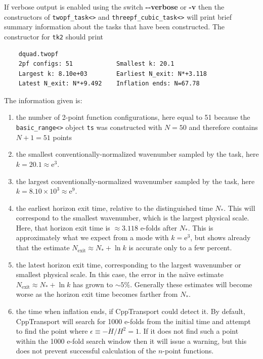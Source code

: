 \documentclass[11pt,a4paper]{article}
\newcommand{\e}[1]{\mathrm{e}^{{#1}}}
\newcommand{\Nexit}{N_{\text{exit}}}
\newcommand{\Nstar}{N_{\ast}}
\newcommand{\packagefont}{\sffamily}
\newcommand{\CppTransport}{{\packagefont CppTransport}}
\newcommand{\option}[1]{{\ttfamily\bfseries\small #1}}
\begin{document}
If verbose output is enabled using the switch
\option{{-}{-}verbose}
or
\option{-v}
then the constructors of
\texttt{twopf_task<>}
and \texttt{threepf_cubic_task<>}
will print brief summary information about the
tasks that have been constructed.
The constructor for \texttt{tk2}
should print
\begin{verbatim}
    dquad.twopf
    2pf configs: 51            Smallest k: 20.1           
    Largest k: 8.10e+03        Earliest N_exit: N*+3.118  
    Latest N_exit: N*+9.492    Inflation ends: N=67.78
\end{verbatim}
The information given is:
\begin{enumerate}
    \item the number of 2-point function configurations, here
    equal to 51 because the
    \texttt{basic_range<>} object \texttt{ts}
    was constructed with $N=50$ and therefore contains $N+1 = 51$
    points
    
    \item the smallest conventionally-normalized wavenumber sampled by
    the task, here
    $k = 20.1 \approx \e{3}$.
    
    \item the largest conventionally-normalized wavenumber sampled by
    the task, here
    $k = 8.10 \times 10^3 \approx \e{9}$.
    
    \item the earliest horizon exit time, relative to the distinguished
    time $\Nstar$. This will correspond to the smallest wavenumber,
    which is the largest physical scale.
    Here, that horizon exit time is $\approx 3.118$ e-folds after
    $\Nstar$.
    This is approximately what we expect from a mode with
    $k = \e{3}$, but shows already that
    the estimate $\Nexit \approx \Nstar + \ln k$
    is accurate only to a few percent.
    
    \item the latest horizon exit time, corresponding to the largest
    wavenumber or smallest physical scale.
    In this case, the error in the na\"{\i}ve estimate
    $\Nexit \approx \Nstar + \ln k$ has grown to $\sim 5\%$.
    Generally these estimates will become worse as the horizon
    exit time becomes farther from $\Nstar$.
    
    \item the time when inflation ends, if {\CppTransport}
    could detect it. By default, {\CppTransport} will search for
    1000 e-folds from the initial time
    and attempt to find the point where $\epsilon \equiv - \dot{H}/H^2 = 1$.
    If it does not find such a point within the 1000 e-fold search window
    then it will issue a warning, but this does not prevent
    successful calculation of the $n$-point functions.
\end{enumerate}
\end{document}
